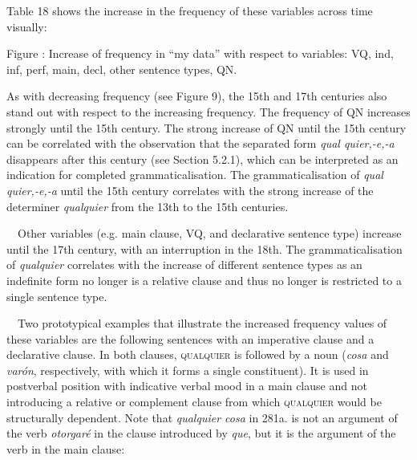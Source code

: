 \begin{styleStandard}
Table 18 shows the increase in the frequency of these variables across time visually:
\end{styleStandard}

\begin{styleStandard}
Figure : Increase of frequency in “my data” with respect to variables: VQ, ind, inf, perf, main, decl, other sentence types, QN.
\end{styleStandard}

\begin{styleStandard}
As with decreasing frequency (see Figure 9), the 15th and 17th centuries also stand out with respect to the increasing frequency. The frequency of QN increases strongly until the 15th century. The strong increase of QN until the 15th century can be correlated with the observation that the separated form \textit{qual quier,-e,-a} disappears after this century (see Section 5.2.1), which can be interpreted as an indication for completed grammaticalisation. The grammaticalisation of \textit{qual quier,-e,-a} until the 15th century correlates with the strong increase of the determiner \textit{qualquier} from the 13th to the 15th centuries.
\end{styleStandard}

\begin{styleStandard}
\ \ Other variables (e.g. main clause, VQ, and declarative sentence type) increase until the 17th century, with an interruption in the 18th. The grammaticalisation of \textit{qualquier} correlates with the increase of different sentence types as an indefinite form no longer is a relative clause and thus no longer is restricted to a single sentence type.
\end{styleStandard}

\begin{styleStandard}
\ \ Two prototypical examples that illustrate the increased frequency values of these variables are the following sentences with an imperative clause and a declarative clause. In both clauses, \textsc{qualquier} is followed by a noun (\textit{cosa} and \textit{varón}, respectively, with which it forms a single constituent). It is used in postverbal position with indicative verbal mood in a main clause and not introducing a relative or complement clause from which \textsc{qualquier} would be structurally dependent. Note that \textit{qualquier cosa} in 281a. is not an argument of the verb \textit{otorgaré} in the clause introduced by\textit{ que}, but it is the argument of the verb in the main clause:
\end{styleStandard}

